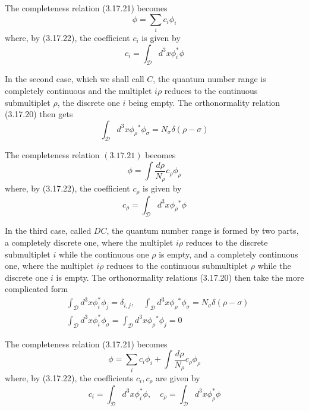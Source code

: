\documentclass{article}
\begin{document}
The completeness relation (3.17.21) becomes
$$
\begin{equation*}
\phi=\sum_{i} c_{i} \phi_{i} \tag{3.17.25}
\end{equation*}
$$
where, by (3.17.22), the coefficient $c_{i}$ is given by
$$
\begin{equation*}
c_{i}=\int_{\mathcal{D}} d^{3} x \phi_{i}^{*} \phi \tag{3.17.26}
\end{equation*}
$$

In the second case, which we shall call $C$, the quantum number range is completely continuous and the multiplet $i \rho$ reduces to the continuous submultiplet $\rho$, the discrete one $i$ being empty. The orthonormality relation (3.17.20) then gets
$$
\begin{equation*}
\int_{\mathcal{D}} d^{3} x \phi_{\rho}{ }^{*} \phi_{\sigma}=N_{\sigma} \delta(\rho-\sigma) \tag{3.17.27}
\end{equation*}
$$

The completeness relation $(3.17 .21)$ becomes
$$
\begin{equation*}
\phi=\int \frac{d \rho}{N_{\rho}} c_{\rho} \phi_{\rho} \tag{3.17.28}
\end{equation*}
$$
where, by (3.17.22), the coefficient $c_{\rho}$ is given by
$$
\begin{equation*}
c_{\rho}=\int_{\mathcal{D}} d^{3} x \phi_{\rho}{ }^{*} \phi \tag{3.17.29}
\end{equation*}
$$

In the third case, called $D C$, the quantum number range is formed by two parts, a completely discrete one, where the multiplet $i \rho$ reduces to the discrete submultiplet $i$ while the continuous one $\rho$ is empty, and a completely continuous one, where the multiplet $i \rho$ reduces to the continuous submultiplet $\rho$ while the discrete one $i$ is empty. The orthonormality relations (3.17.20) then take the more complicated form
$$
\begin{align*}
& \int_{\mathcal{D}} d^{3} x \phi_{i}^{*} \phi_{j}=\delta_{i, j}, \quad \int_{\mathcal{D}} d^{3} x \phi_{\rho}{ }^{*} \phi_{\sigma}=N_{\sigma} \delta(\rho-\sigma)  \tag{3.17.30}\\
& \int_{\mathcal{D}} d^{3} x \phi_{i}^{*} \phi_{\sigma}=\int_{\mathcal{D}} d^{3} x \phi_{\rho}{ }^{*} \phi_{j}=0
\end{align*}
$$

The completeness relation (3.17.21) becomes
$$
\begin{equation*}
\phi=\sum_{i} c_{i} \phi_{i}+\int \frac{d \rho}{N_{\rho}} c_{\rho} \phi_{\rho} \tag{3.17.31}
\end{equation*}
$$
where, by (3.17.22), the coefficients $c_{i}, c_{\rho}$ are given by
$$
\begin{equation*}
c_{i}=\int_{\mathcal{D}} d^{3} x \phi_{i}^{*} \phi, \quad c_{\rho}=\int_{\mathcal{D}} d^{3} x \phi_{\rho}^{*} \phi \tag{3.17.32}
\end{equation*}
$$
\end{document}
